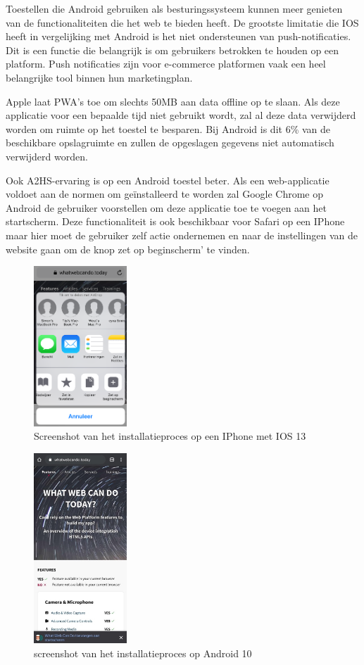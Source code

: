 	Toestellen die Android gebruiken als besturingssysteem kunnen meer genieten van de functionaliteiten die het web te bieden heeft.
	De grootste limitatie die IOS heeft in vergelijking met Android is het niet ondersteunen van push-notificaties. Dit is een functie die belangrijk is om gebruikers betrokken te houden op een platform. Push notificaties zijn voor e-commerce platformen vaak een heel belangrijke tool binnen hun marketingplan.
	\autocite{Anastasia2017}
	
	Apple laat PWA's toe om slechts 50MB aan data offline op te slaan. Als deze applicatie voor een bepaalde tijd niet gebruikt wordt, zal al deze data verwijderd worden om ruimte op het toestel te besparen. Bij Android is dit 6\% van de beschikbare opslagruimte en zullen de opgeslagen gegevens niet automatisch verwijderd worden.
	
	Ook A2HS-ervaring is op een Android toestel beter. Als een web-applicatie voldoet aan de normen om geïnstalleerd te worden zal Google Chrome op Android de gebruiker voorstellen om deze applicatie toe te voegen aan het startscherm. Deze functionaliteit is ook beschikbaar voor Safari op een IPhone maar hier moet de gebruiker zelf actie ondernemen en naar de instellingen van de website gaan om de knop zet op beginscherm’ te vinden.
	
	\begin{figure}[H]
		\centering
		\includegraphics[width=35mm]{./img/installation_ios.png}
		\caption{Screenshot van het installatieproces op een IPhone met IOS 13}
	\end{figure}
	
	\begin{figure}[H]
		\centering
		\includegraphics[width=35mm]{./img/installation_android.png}
		\caption{screenshot van het installatieproces op Android 10}
	\end{figure}


